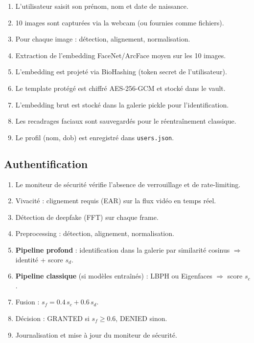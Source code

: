 \documentclass[12pt,a4paper]{article}
\begin{document}
\begin{enumerate}
  \item L'utilisateur saisit son prénom, nom et date de naissance.
  \item 10 images sont capturées via la webcam (ou fournies comme fichiers).
  \item Pour chaque image : détection, alignement, normalisation.
  \item Extraction de l'embedding FaceNet/ArcFace moyen sur les 10 images.
  \item L'embedding est projeté via BioHashing (token secret de l'utilisateur).
  \item Le template protégé est chiffré AES-256-GCM et stocké dans le vault.
  \item L'embedding brut est stocké dans la galerie pickle pour l'identification.
  \item Les recadrages faciaux sont sauvegardés pour le réentraînement classique.
  \item Le profil (nom, dob) est enregistré dans \texttt{users.json}.
\end{enumerate}

\subsection{Authentification}

\begin{enumerate}
  \item Le moniteur de sécurité vérifie l'absence de verrouillage et de
        rate-limiting.
  \item Vivacité : clignement requis (EAR) sur la flux vidéo en temps réel.
  \item Détection de deepfake (FFT) sur chaque frame.
  \item Preprocessing : détection, alignement, normalisation.
  \item \textbf{Pipeline profond} : identification dans la galerie par
        similarité cosinus $\Rightarrow$ identité + score $s_d$.
  \item \textbf{Pipeline classique} (si modèles entraînés) : LBPH ou
        Eigenfaces $\Rightarrow$ score $s_c$.
  \item Fusion : $s_f = 0.4 \, s_c + 0.6 \, s_d$.
  \item Décision : GRANTED si $s_f \geq 0.6$, DENIED sinon.
  \item Journalisation et mise à jour du moniteur de sécurité.
\end{enumerate}
\end{document}
